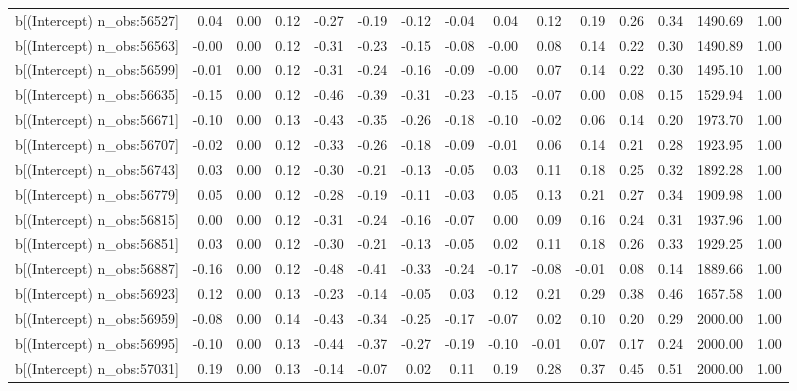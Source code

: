 \begin{table}[ht]
\begin{tabular}{rrrrrrrrrrrrrrr}
  b[(Intercept) n\_obs:56527] & 0.04 & 0.00 & 0.12 & -0.27 & -0.19 & -0.12 & -0.04 & 0.04 & 0.12 & 0.19 & 0.26 & 0.34 & 1490.69 & 1.00 \\ 
  b[(Intercept) n\_obs:56563] & -0.00 & 0.00 & 0.12 & -0.31 & -0.23 & -0.15 & -0.08 & -0.00 & 0.08 & 0.14 & 0.22 & 0.30 & 1490.89 & 1.00 \\ 
  b[(Intercept) n\_obs:56599] & -0.01 & 0.00 & 0.12 & -0.31 & -0.24 & -0.16 & -0.09 & -0.00 & 0.07 & 0.14 & 0.22 & 0.30 & 1495.10 & 1.00 \\ 
  b[(Intercept) n\_obs:56635] & -0.15 & 0.00 & 0.12 & -0.46 & -0.39 & -0.31 & -0.23 & -0.15 & -0.07 & 0.00 & 0.08 & 0.15 & 1529.94 & 1.00 \\ 
  b[(Intercept) n\_obs:56671] & -0.10 & 0.00 & 0.13 & -0.43 & -0.35 & -0.26 & -0.18 & -0.10 & -0.02 & 0.06 & 0.14 & 0.20 & 1973.70 & 1.00 \\ 
  b[(Intercept) n\_obs:56707] & -0.02 & 0.00 & 0.12 & -0.33 & -0.26 & -0.18 & -0.09 & -0.01 & 0.06 & 0.14 & 0.21 & 0.28 & 1923.95 & 1.00 \\ 
  b[(Intercept) n\_obs:56743] & 0.03 & 0.00 & 0.12 & -0.30 & -0.21 & -0.13 & -0.05 & 0.03 & 0.11 & 0.18 & 0.25 & 0.32 & 1892.28 & 1.00 \\ 
  b[(Intercept) n\_obs:56779] & 0.05 & 0.00 & 0.12 & -0.28 & -0.19 & -0.11 & -0.03 & 0.05 & 0.13 & 0.21 & 0.27 & 0.34 & 1909.98 & 1.00 \\ 
  b[(Intercept) n\_obs:56815] & 0.00 & 0.00 & 0.12 & -0.31 & -0.24 & -0.16 & -0.07 & 0.00 & 0.09 & 0.16 & 0.24 & 0.31 & 1937.96 & 1.00 \\ 
  b[(Intercept) n\_obs:56851] & 0.03 & 0.00 & 0.12 & -0.30 & -0.21 & -0.13 & -0.05 & 0.02 & 0.11 & 0.18 & 0.26 & 0.33 & 1929.25 & 1.00 \\ 
  b[(Intercept) n\_obs:56887] & -0.16 & 0.00 & 0.12 & -0.48 & -0.41 & -0.33 & -0.24 & -0.17 & -0.08 & -0.01 & 0.08 & 0.14 & 1889.66 & 1.00 \\ 
  b[(Intercept) n\_obs:56923] & 0.12 & 0.00 & 0.13 & -0.23 & -0.14 & -0.05 & 0.03 & 0.12 & 0.21 & 0.29 & 0.38 & 0.46 & 1657.58 & 1.00 \\ 
  b[(Intercept) n\_obs:56959] & -0.08 & 0.00 & 0.14 & -0.43 & -0.34 & -0.25 & -0.17 & -0.07 & 0.02 & 0.10 & 0.20 & 0.29 & 2000.00 & 1.00 \\ 
  b[(Intercept) n\_obs:56995] & -0.10 & 0.00 & 0.13 & -0.44 & -0.37 & -0.27 & -0.19 & -0.10 & -0.01 & 0.07 & 0.17 & 0.24 & 2000.00 & 1.00 \\ 
  b[(Intercept) n\_obs:57031] & 0.19 & 0.00 & 0.13 & -0.14 & -0.07 & 0.02 & 0.11 & 0.19 & 0.28 & 0.37 & 0.45 & 0.51 & 2000.00 & 1.00 \\ 

\end{tabular}
\end{table}
